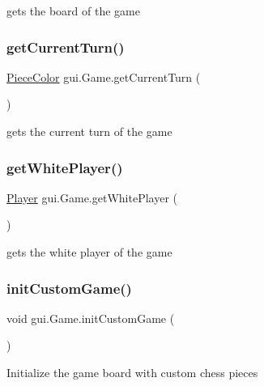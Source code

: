 gets the board of the game \mbox{\label{classgui_1_1_game_a7e5a9526328a3098b37bd3ea32f8359f}} 
\subsubsection{\texorpdfstring{get\+Current\+Turn()}{getCurrentTurn()}}
{\footnotesize\ttfamily \mbox{\hyperlink{enumpieces_1_1_piece_1_1_piece_color}{Piece\+Color}} gui.\+Game.\+get\+Current\+Turn (\begin{DoxyParamCaption}{ }\end{DoxyParamCaption})}

gets the current turn of the game \mbox{\label{classgui_1_1_game_a90a639909c028168666c3db0ac058610}} 
\subsubsection{\texorpdfstring{get\+White\+Player()}{getWhitePlayer()}}
{\footnotesize\ttfamily \mbox{\hyperlink{classplayers_1_1_player}{Player}} gui.\+Game.\+get\+White\+Player (\begin{DoxyParamCaption}{ }\end{DoxyParamCaption})}

gets the white player of the game \mbox{\label{classgui_1_1_game_a74895d53bf09abcd355009defffb4303}} 
\subsubsection{\texorpdfstring{init\+Custom\+Game()}{initCustomGame()}}
{\footnotesize\ttfamily void gui.\+Game.\+init\+Custom\+Game (\begin{DoxyParamCaption}{ }\end{DoxyParamCaption})}

Initialize the game board with custom chess pieces \mbox{\label{classgui_1_1_game_acde5ae47d364b6bddfc9be9fc535b8cc}} 
